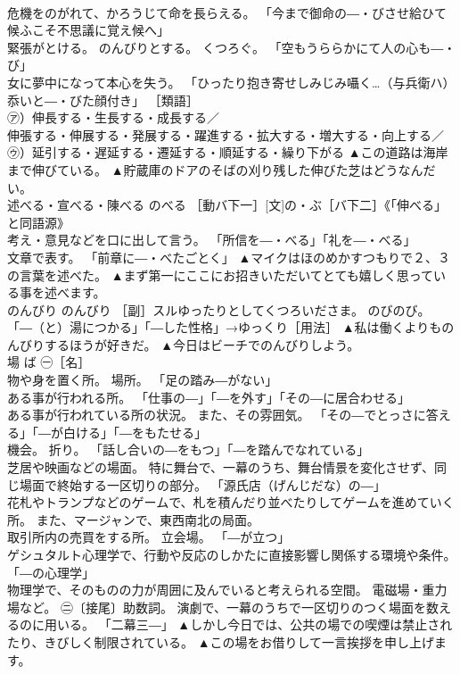 \documentclass[8pt]{extreport}
\begin{document}
\begin{CJK}{UTF8}{min}
\\	危機をのがれて、かろうじて命を長らえる。 「今まで御命の―・びさせ給ひて候ふこそ不思議に覚え候へ」 
\\	緊張がとける。 のんびりとする。 くつろぐ。 「空もうららかにて人の心も―・び」 
\\	女に夢中になって本心を失う。 「ひったり抱き寄せしみじみ囁く…（与兵衛ハ）忝いと―・びた顔付き」 ［類語］
\\	㋐）伸長する・生長する・成長する／
\\	伸張する・伸展する・発展する・躍進する・拡大する・増大する・向上する／
\\	㋒）延引する・遅延する・遷延する・順延する・繰り下がる	▲この道路は海岸まで伸びている。 ▲貯蔵庫のドアのそばの刈り残した伸びた芝はどうなんだい。
\\	述べる・宣べる・陳べる	のべる	［動バ下一］[文]の・ぶ［バ下二］《「伸べる」と同語源》 
\\	考え・意見などを口に出して言う。 「所信を―・べる」「礼を―・べる」 
\\	文章で表す。 「前章に―・べたごとく」	▲マイクはほのめかすつもりで２、３の言葉を述べた。 ▲まず第一にここにお招きいただいてとても嬉しく思っている事を述べます。
\\	のんびり	のんびり	［副］スルゆったりとしてくつろいださま。 のびのび。 「―（と）湯につかる」「―した性格」→ゆっくり［用法］	▲私は働くよりものんびりするほうが好きだ。 ▲今日はビーチでのんびりしよう。
\\	場	ば	㊀［名］ 
\\	物や身を置く所。 場所。 「足の踏み―がない」 
\\	ある事が行われる所。 「仕事の―」「―を外す」「その―に居合わせる」 
\\	ある事が行われている所の状況。 また、その雰囲気。 「その―でとっさに答える」「―が白ける」「―をもたせる」 
\\	機会。 折り。 「話し合いの―をもつ」「―を踏んでなれている」 
\\	芝居や映画などの場面。 特に舞台で、一幕のうち、舞台情景を変化させず、同じ場面で終始する一区切りの部分。 「源氏店（げんじだな）の―」 
\\	花札やトランプなどのゲームで、札を積んだり並べたりしてゲームを進めていく所。 また、マージャンで、東西南北の局面。 
\\	取引所内の売買をする所。 立会場。 「―が立つ」 
\\	ゲシュタルト心理学で、行動や反応のしかたに直接影響し関係する環境や条件。 「―の心理学」 
\\	物理学で、そのものの力が周囲に及んでいると考えられる空間。 電磁場・重力場など。 ㊁〔接尾〕助数詞。 演劇で、一幕のうちで一区切りのつく場面を数えるのに用いる。 「二幕三―」	▲しかし今日では、公共の場での喫煙は禁止されたり、きびしく制限されている。 ▲この場をお借りして一言挨拶を申し上げます。

\end{CJK}
\end{document}
